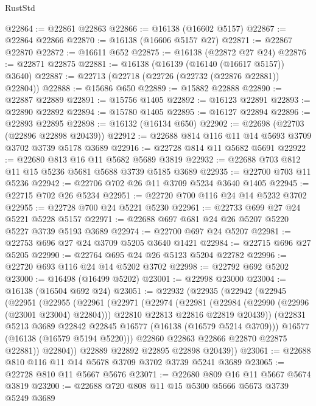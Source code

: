 \begin{lexlean}{RustStd}
\begin{coremodule}
@22864 := @22861 @22863
@22866 := @16138 (@16602 @5157)
@22867 := @22864 @22866
@22870 := @16138 (@16606 @5157 @27)
@22871 := @22867 @22870
@22872 := @16611 @652
@22875 := @16138 (@22872 @27 @24)
@22876 := @22871 @22875
@22881 := @16138 (@16139 (@16140 (@16617 @5157)) @3640)
@22887 := @22713 (@22718 (@22726 (@22732 (@22876 @22881)) @22804))
@22888 := @15686 @650
@22889 := @15882 @22888
@22890 := @22887 @22889
@22891 := @15756 @1405
@22892 := @16123 @22891
@22893 := @22890 @22892
@22894 := @15780 @1405
@22895 := @16127 @22894
@22896 := @22893 @22895
@22898 := @16132 (@16134 @650)
@22902 := @22698 (@22703 (@22896 @22898 @20439))
@22912 := @22688 @814 @116 @11 @14 @5693 @3709 @3702 @3739 @5178 @3689
@22916 := @22728 @814 @11 @5682 @5691
@22922 := @22680 @813 @16 @11 @5682 @5689 @3819
@22932 := @22688 @703 @812 @11 @15 @5236 @5681 @5688 @3739 @5185 @3689
@22935 := @22700 @703 @11 @5236
@22942 := @22706 @702 @26 @11 @3709 @5234 @3640 @1405
@22945 := @22715 @702 @26 @5234
@22951 := @22720 @700 @116 @24 @14 @5232 @3702
@22955 := @22728 @700 @24 @5221 @5230
@22961 := @22733 @699 @27 @24 @5221 @5228 @5157
@22971 := @22688 @697 @681 @24 @26 @5207 @5220 @5227 @3739 @5193 @3689
@22974 := @22700 @697 @24 @5207
@22981 := @22753 @696 @27 @24 @3709 @5205 @3640 @1421
@22984 := @22715 @696 @27 @5205
@22990 := @22764 @695 @24 @26 @5123 @5204 @22782
@22996 := @22720 @693 @116 @24 @14 @5202 @3702
@22998 := @22792 @692 @5202
@23000 := @16498 (@16499 @5202)
@23001 := @22998 @23000
@23004 := @16138 (@16504 @692 @24)
@23051 := @22932
    (@22935
      (@22942
        (@22945
          (@22951
            (@22955
              (@22961
                (@22971
                  (@22974
                    (@22981
                      (@22984 (@22990 (@22996 (@23001 @23004) @22804)))
                      @22810
                      @22813
                      @22816
                      @22819
                      @20439))
                  (@22831 @5213 @3689 @22842 @22845 @16577 (@16138 (@16579 @5214 @3709)))
                  @16577
                  (@16138 (@16579 @5194 @5220)))
                @22860
                @22863
                @22866
                @22870
                @22875
                @22881))
            @22804))
        @22889
        @22892
        @22895
        @22898
        @20439))
@23061 := @22688 @810 @116 @11 @14 @5678 @3709 @3702 @3739 @5241 @3689
@23065 := @22728 @810 @11 @5667 @5676
@23071 := @22680 @809 @16 @11 @5667 @5674 @3819
@23200 := @22688
    @720
    @808
    @11
    @15
    @5300
    @5666
    @5673
    @3739
    @5249
    @3689

\end{coremodule}
\end{lexlean}
